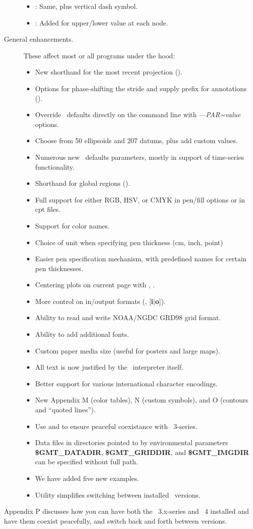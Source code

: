 \begin{description}
\begin{itemize}
\item {}: 	Same, plus vertical dash symbol.
\item {}: 	Added  for upper/lower value at each node.
\end{itemize}
\item [General enhancements.]  These affect most or all programs under the hood:
\begin{itemize}
\item New shorthand for the most recent projection ().
\item Options for phase-shifting the stride and supply prefix for annotations ().
\item Override \GMT\ defaults directly on the command line with {--}{--}\emph{PAR=value} options.
\item Choose from 50 ellipsoids and 207 datums, plus add custom values.
\item Numerous new \GMT\ defaults parameters, mostly in support of time-series functionality.
\item Shorthand for global regions ().
\item Full support for either RGB, HSV, or CMYK in pen/fill options or in cpt files.
\item Support for color names.
\item Choice of unit when specifying pen thickness (cm, inch, point)
\item Easier pen specification mechanism, with predefined names for certain pen thicknesses.
\item Centering plots on current page with , .
\item More control on in/output formats (, \Opt{:}[{\bf i$|$o}]).
\item Ability to read and write NOAA/NGDC GRD98 grid format.
\item Ability to add additional fonts.
\item Custom paper media size (useful for posters and large maps).
\item All text is now justified by the \PS\ interpreter itself.
\item Better support for various international character encodings.
\item New Appendix M (color tables), N (custom symbols), and O (contours and ``quoted lines'').
\item Use  and  to ensure peaceful coexistance with \GMT\ 3-series.
\item Data files in directories pointed to by environmental parameters {\bf \$GMT\_DATADIR}, {\bf \$GMT\_GRIDDIR},
and {\bf \$GMT\_IMGDIR} can be specified without full path.
\item We have added five new examples.
\item Utility  simplifies switching between installed \GMT\ versions.
\end{itemize}
\end{description}
Appendix P discusses how you can have both the \GMT\ 3.x-series and \GMT\ 4 installed and have them coexist peacefully,
and switch back and forth between versions.


